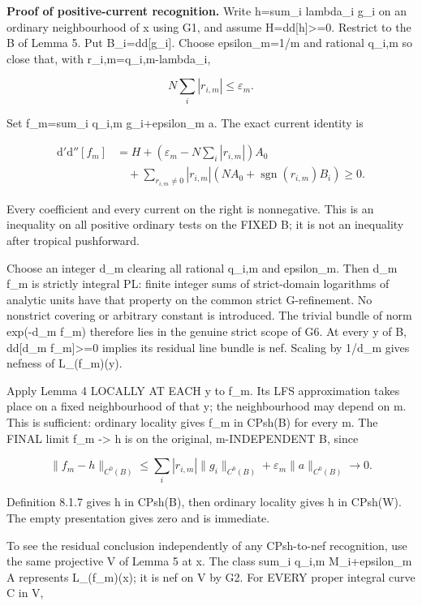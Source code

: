 \documentclass[
  11pt,
]{article}
\newcommand{\ddc}{\mathrm d'\mathrm d''}
\begin{document}
\textbf{Proof of positive-current recognition.} Write h=sum\_i lambda\_i
g\_i on an ordinary neighbourhood of x using G1, and assume
H=dd{[}h{]}\textgreater=0. Restrict to the B of Lemma 5. Put
B\_i=dd{[}g\_i{]}. Choose epsilon\_m=1/m and rational q\_i,m so close
that, with r\_i,m=q\_i,m-lambda\_i,

\[
N\sum_i|r_{i,m}|\le\varepsilon_m.
\]

Set f\_m=sum\_i q\_i,m g\_i+epsilon\_m a. The exact current identity is

\[
\begin{aligned}\ddc[f_m]&=H+\left(\varepsilon_m-N\sum_i|r_{i,m}|\right)A_0\\&\quad+\sum_{r_{i,m}\ne0}|r_{i,m}|\left(NA_0+\operatorname{sgn}(r_{i,m})B_i\right)\ge0.\end{aligned}
\]

Every coefficient and every current on the right is nonnegative. This is
an inequality on all positive ordinary tests on the FIXED B; it is not
an inequality after tropical pushforward.

Choose an integer d\_m clearing all rational q\_i,m and epsilon\_m. Then
d\_m f\_m is strictly integral PL: finite integer sums of strict-domain
logarithms of analytic units have that property on the common strict
G-refinement. No nonstrict covering or arbitrary constant is introduced.
The trivial bundle of norm exp(-d\_m f\_m) therefore lies in the genuine
strict scope of G6. At every y of B, dd{[}d\_m f\_m{]}\textgreater=0
implies its residual line bundle is nef. Scaling by 1/d\_m gives nefness
of L\_(f\_m)(y).

Apply Lemma 4 LOCALLY AT EACH y to f\_m. Its LFS approximation takes
place on a fixed neighbourhood of that y; the neighbourhood may depend
on m. This is sufficient: ordinary locality gives f\_m in CPsh(B) for
every m. The FINAL limit f\_m -\textgreater{} h is on the original,
m-INDEPENDENT B, since

\[
\|f_m-h\|_{C^0(B)}\le\sum_i|r_{i,m}|\|g_i\|_{C^0(B)}+\varepsilon_m\|a\|_{C^0(B)}\longrightarrow0.
\]

Definition 8.1.7 gives h in CPsh(B), then ordinary locality gives h in
CPsh(W). The empty presentation gives zero and is immediate.

To see the residual conclusion independently of any CPsh-to-nef
recognition, use the same projective V of Lemma 5 at x. The class sum\_i
q\_i,m M\_i+epsilon\_m A represents L\_(f\_m)(x); it is nef on V by G2.
For EVERY proper integral curve C in V,
\end{document}
